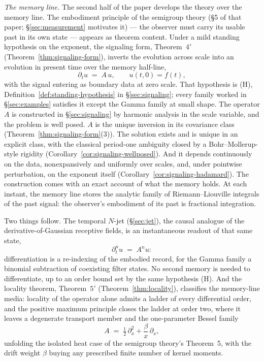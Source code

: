 \emph{The memory line.} The second half of the paper develops the theory over the
memory line. The embodiment
principle of the semigroup theory (\S5 of that paper; \S\ref{sec:measurement} motivates it)
--- the observer must carry its usable past in its own state --- appears as theorem
content. Under a mild standing hypothesis on the exponent, the signaling form,
Theorem~$4'$ (Theorem~\ref{thm:signaling-form}), inverts the evolution across scale into an
evolution in present time over the memory half-line,
\[
  \partial_t u \;=\; A\,u, \qquad u(t, 0) = f(t),
\]
with the signal entering as boundary data at zero scale. That hypothesis is (H),
Definition~\ref{def:standing-hypothesis} in \S\ref{sec:signaling}; every family
worked in \S\ref{sec:examples} satisfies it except the Gamma family at small shape. The operator $A$ is constructed in
\S\ref{sec:signaling} by harmonic analysis in the scale variable, and the problem is
well posed. $A$ is the unique inversion in its covariance class
(Theorem~\ref{thm:signaling-form}(3)). The solution exists and is unique in an explicit
class, with the classical period-one ambiguity closed by a Bohr--Mollerup-style rigidity
(Corollary~\ref{cor:signaling-wellposed}). And it depends continuously on the data,
nonexpansively and uniformly over scales, and, under pointwise perturbation, on the
exponent itself (Corollary~\ref{cor:signaling-hadamard}). The construction comes with an exact account of what the memory holds.
At each instant, the memory line stores the analytic family of Riemann--Liouville integrals
of the past signal: the observer's embodiment of its past is fractional integration.

Two things follow. The temporal $N$-jet (\S\ref{sec:jet}), the causal analogue of the
derivative-of-Gaussian receptive fields, is an instantaneous readout of that same state,
\[
  \partial_t^n u \;=\; A^n u :
\]
differentiation is a re-indexing of the embodied record, for the Gamma family a binomial
subtraction of coexisting filter states. No second memory is needed to differentiate,
up to an order bound set by the same hypothesis (H). And the locality theorem, Theorem~$5'$
(Theorem~\ref{thm:locality}), classifies the memory-line media: locality of the operator
alone admits a ladder of every differential order, and the positive maximum principle closes
the ladder at order two, where it leaves a degenerate transport member and the
one-parameter Bessel family
\[
  A \;=\; \tfrac12\,\partial_x^2 + \frac{\beta}{x}\,\partial_x ,
\]
unfolding the isolated heat case of the semigroup theory's Theorem~5, with the drift weight
$\beta$ buying any prescribed finite number of kernel moments.

